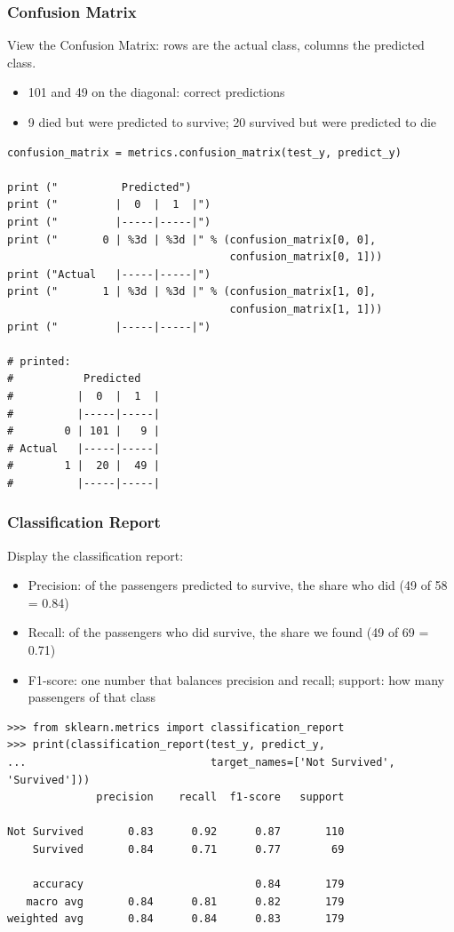 \begin{frame}[fragile]\frametitle{Confusion Matrix}
View the Confusion Matrix: rows are the actual class, columns the predicted class.
\begin{itemize}
\item 101 and 49 on the diagonal: correct predictions
\item 9 died but were predicted to survive; 20 survived but were predicted to die
\end{itemize}
\begin{lstlisting}
confusion_matrix = metrics.confusion_matrix(test_y, predict_y)

print ("          Predicted")
print ("         |  0  |  1  |")
print ("         |-----|-----|")
print ("       0 | %3d | %3d |" % (confusion_matrix[0, 0],
                                   confusion_matrix[0, 1]))
print ("Actual   |-----|-----|")
print ("       1 | %3d | %3d |" % (confusion_matrix[1, 0],
                                   confusion_matrix[1, 1]))
print ("         |-----|-----|")

# printed:
#           Predicted
#          |  0  |  1  |
#          |-----|-----|
#        0 | 101 |   9 |
# Actual   |-----|-----|
#        1 |  20 |  49 |
#          |-----|-----|
\end{lstlisting}
\end{frame}


\begin{frame}[fragile]\frametitle{Classification Report}
Display the classification report:
\begin{itemize}
\item Precision: of the passengers predicted to survive, the share who did (49 of 58 = 0.84)
\item Recall: of the passengers who did survive, the share we found (49 of 69 = 0.71)
\item F1-score: one number that balances precision and recall; support: how many passengers of that class
\end{itemize}
\begin{lstlisting}
>>> from sklearn.metrics import classification_report
>>> print(classification_report(test_y, predict_y,
...                             target_names=['Not Survived', 'Survived']))
              precision    recall  f1-score   support

Not Survived       0.83      0.92      0.87       110
    Survived       0.84      0.71      0.77        69

    accuracy                           0.84       179
   macro avg       0.84      0.81      0.82       179
weighted avg       0.84      0.84      0.83       179
\end{lstlisting}
\end{frame}

